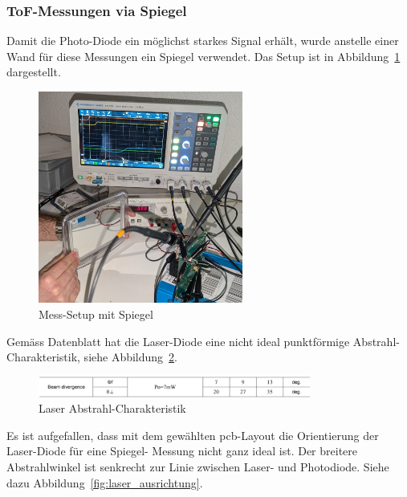 \subsubsection{ToF-Messungen via Spiegel}\label{sec:messungen_spiegel}

Damit die Photo-Diode ein möglichst starkes Signal erhält, wurde anstelle einer Wand für diese Messungen ein Spiegel
verwendet. Das Setup ist in Abbildung~\ref{fig:spiegel_setup} dargestellt.

\begin{figure}[H]
    \centering
    \includegraphics[width=0.6\textwidth]{graphics/spiegel_setup.jpg}
    \caption{Mess-Setup mit Spiegel}\label{fig:spiegel_setup}
\end{figure}

Gemäss Datenblatt hat die Laser-Diode eine nicht ideal punktförmige Abstrahl-Charakteristik, siehe
Abbildung~\ref{fig:laser_abstrahl_charakteristik}.

\begin{figure}[H]
    \centering
    \includegraphics[width=0.8\textwidth]{graphics/laser_abstrahl_charakteristik.pdf}
    \caption[Laser Abstrahl-Charakteristik]{Laser Abstrahl-Charakteristik \cite{rohm2019rld65nzx1_datasheet}}\label{fig:laser_abstrahl_charakteristik}
\end{figure}

Es ist aufgefallen, dass mit dem gewählten \acrshort{pcb}-Layout die Orientierung der Laser-Diode für eine Spiegel-
Messung nicht ganz ideal ist. Der breitere Abstrahlwinkel ist senkrecht zur Linie zwischen Laser- und Photodiode. Siehe
dazu Abbildung~\ref{fig:laser_ausrichtung}.

